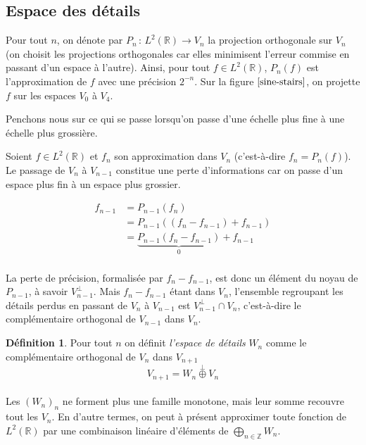 \documentclass[]{article}
\theoremstyle{remark}
\theoremstyle{definition}
\newtheorem{mydef}{Définition}
\newcommand{\funcshort}[3]{
	#1 \, : \, #2 \longrightarrow #3
}
\newcommand{\DS}{\displaystyle}
\begin{document}
	\newpage
		
	\subsection{Espace des détails}
	
	Pour tout $n$, on dénote par $\funcshort{P_n}{L^2(\mathbb{R})}{V_n}$ la projection orthogonale sur $V_n$ (on choisit les projections orthogonales car elles minimisent l'erreur commise en passant d'un espace à l'autre). Ainsi, pour tout $f \in L^2(\mathbb{R})$, $P_n (f)$ est l'approximation de $f$ avec une précision $2^{-n}$. Sur la figure $\ref{sine-stairs}$, on projette $f$ sur les espaces $V_0$ à $V_4$.
	
	Penchons nous sur ce qui se passe lorsqu'on passe d'une échelle plus fine à une échelle plus grossière.
	
	Soient $f \in L^2(\mathbb{R})$ et $f_n$ son approximation dans $V_n$ (c'est-à-dire $f_n = P_n(f)$). Le passage de $V_n$ à $V_{n-1}$ constitue une perte d'informations car on passe d'un espace plus fin à un espace plus grossier.
	
	\begin{align*}
		f_{n-1} &= P_{n-1} (f_n) \\
		&= P_{n-1}( (f_n - f_{n-1}) + f_{n-1}) \\
		&= \underbrace{P_{n-1} (f_n - f_{n-1})}_{0} + f_{n-1} \\
	\end{align*}
	
	La perte de précision, formalisée par $f_n - f_{n-1}$, est donc un élément du noyau de $P_{n-1}$, à savoir $V_{n-1}^\bot$. Mais $f_n - f_{n-1}$ étant dans $V_{n}$, l'ensemble regroupant les détails perdus en passant de $V_n$ à $V_{n-1}$ est $V_{n-1}^\bot \cap V_n$, c'est-à-dire le complémentaire orthogonal de $V_{n-1}$ dans $V_n$.
	
	\begin{mydef}
		Pour tout $n$ on définit \textit{l'espace de détails} $W_{n}$ comme le complémentaire orthogonal de $V_{n}$ dans $V_{n+1}$ $$V_{n+1} = W_n \stackrel{\perp}{\oplus} V_n$$
	\end{mydef}
	
	\paragraph*{}
	Les $(W_n)_n$ ne forment plus une famille monotone, mais leur somme recouvre tout les $V_n$. En d'autre termes, on peut à présent approximer toute fonction de $L^2(\mathbb{R})$ par une combinaison linéaire d'éléments de $\DS \bigoplus_{n \in \mathbb{Z}} W_n$.
	
\end{document}
